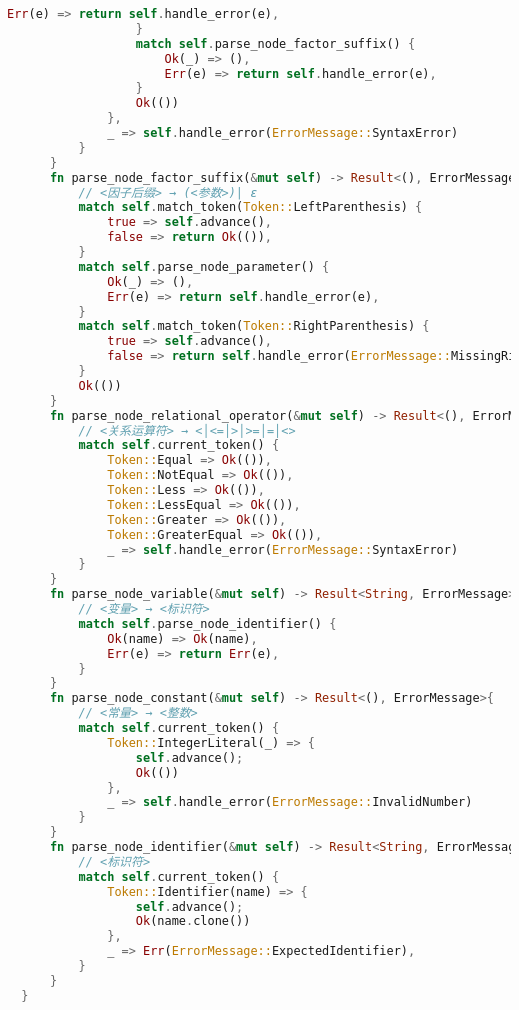 \begin{lstlisting}[caption={语法分析器parse.rs}, label={4:code-example}, captionpos=t, language=rust]
                      Err(e) => return self.handle_error(e),
                  }
                  match self.parse_node_factor_suffix() {
                      Ok(_) => (),
                      Err(e) => return self.handle_error(e),
                  }
                  Ok(())
              },
              _ => self.handle_error(ErrorMessage::SyntaxError)
          }
      }
      fn parse_node_factor_suffix(&mut self) -> Result<(), ErrorMessage>{
          // <因子后缀> → (<参数>)| ε
          match self.match_token(Token::LeftParenthesis) {
              true => self.advance(),
              false => return Ok(()),
          }
          match self.parse_node_parameter() {
              Ok(_) => (),
              Err(e) => return self.handle_error(e),
          }
          match self.match_token(Token::RightParenthesis) {
              true => self.advance(),
              false => return self.handle_error(ErrorMessage::MissingRightParenthesis)
          }
          Ok(())
      }
      fn parse_node_relational_operator(&mut self) -> Result<(), ErrorMessage>{
          // <关系运算符> → <│<=│>│>=│=│<>
          match self.current_token() {
              Token::Equal => Ok(()),
              Token::NotEqual => Ok(()),
              Token::Less => Ok(()),
              Token::LessEqual => Ok(()),
              Token::Greater => Ok(()),
              Token::GreaterEqual => Ok(()),
              _ => self.handle_error(ErrorMessage::SyntaxError)
          }
      }
      fn parse_node_variable(&mut self) -> Result<String, ErrorMessage>{
          // <变量> → <标识符>
          match self.parse_node_identifier() {
              Ok(name) => Ok(name),
              Err(e) => return Err(e),
          }
      }
      fn parse_node_constant(&mut self) -> Result<(), ErrorMessage>{
          // <常量> → <整数>
          match self.current_token() {
              Token::IntegerLiteral(_) => {
                  self.advance();
                  Ok(())
              },
              _ => self.handle_error(ErrorMessage::InvalidNumber)
          }
      }
      fn parse_node_identifier(&mut self) -> Result<String, ErrorMessage>{
          // <标识符>
          match self.current_token() {
              Token::Identifier(name) => {
                  self.advance();
                  Ok(name.clone())
              },
              _ => Err(ErrorMessage::ExpectedIdentifier),
          }
      }
  }
\end{lstlisting}

